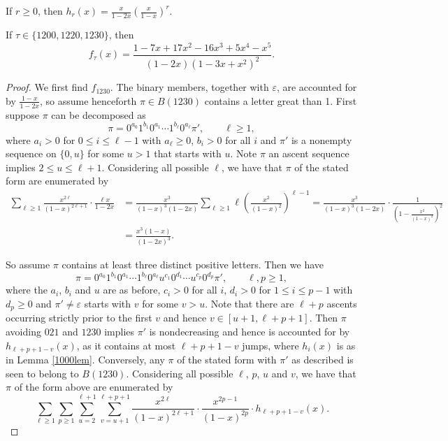 \documentclass[10pt,a4paper]{amsart}
\begin{document}
\begin{lemma}\label{1000lem}
If $r \geq0$, then $h_r(x)=\frac{x}{1-2x}\left(\frac{x}{1-x}\right)^r$.
\end{lemma}

\begin{theorem}\label{1200th}
If $\tau \in \{1200,1220,1230\}$, then
\begin{equation}\label{1200the1}
f_\tau(x)=\frac{1-7x+17x^2-16x^3+5x^4-x^5}{(1-2x)(1-3x+x^2)^2}.
\end{equation}
\end{theorem}

\begin{proof}
We first find $f_{1230}$. The binary members, together with $\varepsilon$, are accounted for by $\frac{1-x}{1-2x}$, so assume henceforth $\pi \in B(1230)$ contains a letter great than 1.  First suppose $\pi$ can be decomposed as
$$\pi=0^{a_0}1^{b_1}0^{a_1}\cdots 1^{b_\ell}0^{a_\ell}\pi', \qquad \ell \geq 1,$$
where $a_i>0$ for $0 \leq i \leq \ell-1$ with $a _\ell \geq0$, $b_i>0$ for all $i$ and $\pi'$ is a nonempty sequence on $\{0,u\}$ for some $u>1$ that starts with $u$.  Note $\pi$ an ascent sequence implies $2 \leq u \leq \ell+1$. Considering all possible $\ell$, we have that $\pi$ of the stated form are enumerated by
\begin{align*}
\sum_{\ell \geq 1}\frac{x^{2\ell}}{(1-x)^{2\ell+1}}\cdot\frac{\ell x}{1-2x}&=\frac{x^3}{(1-x)^3(1-2x)}\sum_{\ell \geq1}\ell\left(\frac{x^2}{(1-x)^2}\right)^{\ell-1}=\frac{x^3}{(1-x)^3(1-2x)}\cdot\frac{1}{\left(1-\frac{x^2}{(1-x)^2}\right)^2}\\
&=\frac{x^3(1-x)}{(1-2x)^3}.
\end{align*}

So assume $\pi$ contains at least three distinct positive letters.  Then we have
$$\pi=0^{a_0}1^{b_1}0^{a_1}\cdots1^{b_\ell}0^{a_{\ell}}u^{c_1}0^{d_1}\cdots u^{c_p}0^{d_p}\pi', \qquad \ell, p \geq 1,$$
where the $a_i$, $b_i$ and $u$ are as before, $c_i>0$ for all $i$, $d_i>0$ for $1 \leq i \leq p-1$ with $d_p\geq0$ and $\pi' \neq \varepsilon$ starts with $v$ for some $v>u$.  Note that there are $\ell+p$ ascents occurring strictly prior to the first $v$ and hence $v \in [u+1,\ell+p+1]$.  Then $\pi$ avoiding $021$ and $1230$ implies $\pi'$ is nondecreasing and hence is accounted for by $h_{\ell+p+1-v}(x)$, as it contains at most $\ell+p+1-v$ jumps, where $h_i(x)$ is as in Lemma \ref{1000lem}.  Conversely, any $\pi$ of the stated form with $\pi'$ as described is seen to belong to $B(1230)$. Considering all possible $\ell$, $p$, $u$ and $v$, we have that $\pi$ of the form above are enumerated by
$$\sum_{\ell \geq1}\sum_{p \geq1}\sum_{u=2}^{\ell+1}\sum_{v=u+1}^{\ell+p+1}\frac{x^{2\ell}}{(1-x)^{2\ell+1}}\cdot\frac{x^{2p-1}}{(1-x)^{2p}}\cdot h_{\ell+p+1-v}(x).$$


\end{proof}
\end{document}
